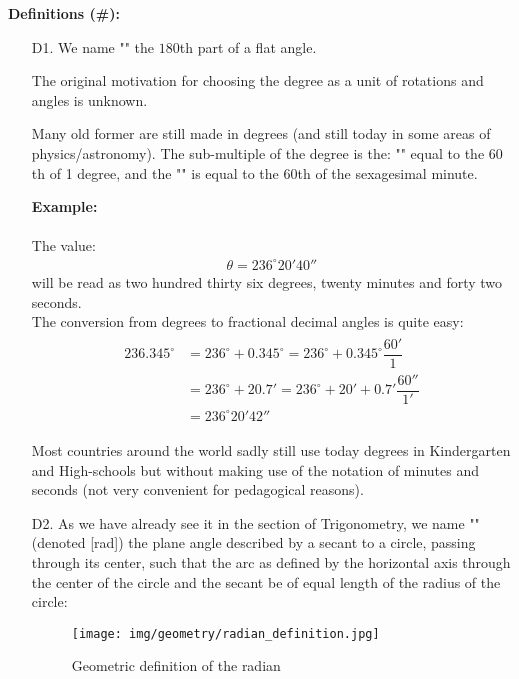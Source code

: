 	\textbf{Definitions (\#\mydef):}
	\begin{enumerate}
		\item[D1.] We name "" the $180$th part of a flat angle.
		
		\begin{tcolorbox}[title=Remark,colframe=black,arc=10pt]
		The original motivation for choosing the degree as a unit of rotations and angles is unknown.
		\end{tcolorbox}
		
		Many old former are still made in degrees (and still today in some areas of physics/astronomy). The sub-multiple of the degree is the: "" equal to the $60$th of 1 degree, and the "" is equal to the $60$th of the sexagesimal minute.
		
		\begin{tcolorbox}[colframe=black,colback=white,sharp corners]
		\textbf{{\Large {}}Example:}\\\\
		The value:
		\begin{gather*}
			\theta=236^\circ 20'40''
		\end{gather*}
		 will be read as two hundred thirty six degrees, twenty minutes and forty two seconds.\\
		 
		 The conversion from degrees to fractional decimal angles is quite easy:
		\begin{gather*}
			\begin{aligned}
			236.345^\circ&=236^\circ+0.345^\circ=236^\circ+0.345^\circ\dfrac{60'}{1}\\
			&=236^\circ+20.7'=236^\circ+20'+0.7'\dfrac{60''}{1'}\\
			&=236^\circ 20'42''
			\end{aligned}
		\end{gather*}
		\end{tcolorbox}
		Most countries around the world sadly still use today degrees in Kindergarten and High-schools but without making use of the notation of minutes and seconds (not very convenient for pedagogical reasons). 

		\item[D2.] As we have already see it in the section of Trigonometry, we name "" (denoted [rad]) the plane angle described by a secant to a circle, passing through its center, such that the arc as defined by the horizontal axis through the center of the circle and the secant be of equal length of the radius of the circle:
		\begin{figure}[H]
			\centering
			\texttt{[image: img/geometry/radian\_definition.jpg]}
			\caption{Geometric definition of the radian}
		\end{figure}


\end{enumerate}
